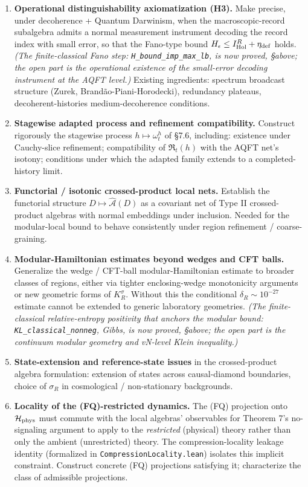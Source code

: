 \documentclass[11pt,a4paper]{article}
\begin{document}
\begin{enumerate}
  \item \textbf{Operational distinguishability axiomatization (H3).} Make precise, under decoherence + Quantum Darwinism, when the macroscopic-record subalgebra admits a normal measurement instrument decoding the record index with small error, so that the Fano-type bound $H_\epsilon \le I_{\rm Hol}^R + \eta_{\rm def}$ holds. \emph{(The finite-classical Fano step: \texttt{H\_bound\_imp\_max\_lb}, is now proved, §above; the open part is the operational existence of the small-error decoding instrument at the AQFT level.)} Existing ingredients: spectrum broadcast structure (Zurek, Brandão-Piani-Horodecki), redundancy plateaus, decoherent-histories medium-decoherence conditions.
  \item \textbf{Stagewise adapted process and refinement compatibility.} Construct rigorously the stagewise process $h \mapsto \omega_t^h$ of §7.6, including: existence under Cauchy-slice refinement; compatibility of $\mathfrak{R}_t(h)$ with the AQFT net's isotony; conditions under which the adapted family extends to a completed-history limit.
  \item \textbf{Functorial / isotonic crossed-product local nets.} Establish the functorial structure $D \mapsto \hat{\mathcal{A}}(D)$ as a covariant net of Type II crossed-product algebras with normal embeddings under inclusion. Needed for the modular-local bound to behave consistently under region refinement / coarse-graining.
  \item \textbf{Modular-Hamiltonian estimates beyond wedges and CFT balls.} Generalize the wedge / CFT-ball modular-Hamiltonian estimate to broader classes of regions, either via tighter enclosing-wedge monotonicity arguments or new geometric forms of $K_R^\sigma$. Without this the conditional $\delta_R \sim 10^{-27}$ estimate cannot be extended to generic laboratory geometries. \emph{(The finite-classical relative-entropy positivity that anchors the modular bound: \texttt{KL\_classical\_nonneg}, Gibbs, is now proved, §above; the open part is the continuum modular geometry and vN-level Klein inequality.)}
  \item \textbf{State-extension and reference-state issues} in the crossed-product algebra formulation: extension of states across causal-diamond boundaries, choice of $\sigma_R$ in cosmological / non-stationary backgrounds.
  \item \textbf{Locality of the (FQ)-restricted dynamics.} The (FQ) projection onto $\mathcal{H}_{\rm phys}$ must commute with the local algebras' observables for Theorem 7's no-signaling argument to apply to the \emph{restricted} (physical) theory rather than only the ambient (unrestricted) theory. The compression-locality leakage identity (formalized in \texttt{CompressionLocality.lean}) isolates this implicit constraint. Construct concrete (FQ) projections satisfying it; characterize the class of admissible projections.
\end{enumerate}
\end{document}
